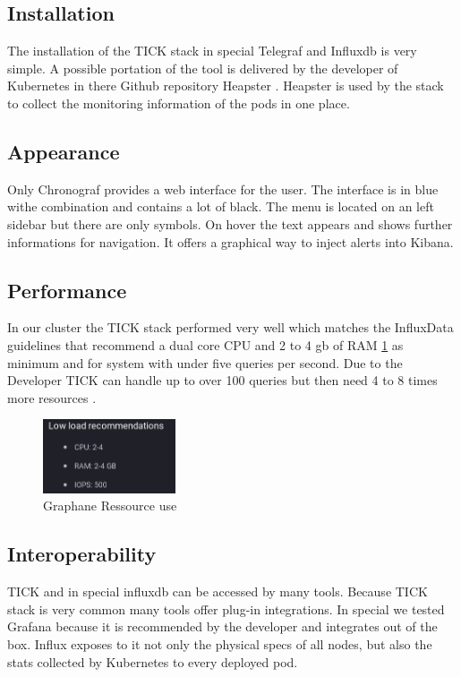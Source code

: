 \subsection{Installation}
The installation of the TICK stack in special Telegraf and Influxdb is very simple. A possible portation of the tool is delivered by the developer of Kubernetes in there Github repository Heapster \cite{heapster}. Heapster is used by the stack to collect the monitoring information of the pods in one place.
\subsection{Appearance}
Only Chronograf provides a web interface for the user. The interface is in blue withe combination and contains a lot of black. The menu is located on an left sidebar but there are only symbols. On hover the text appears and shows further informations for navigation. It offers a graphical way to inject alerts into Kibana.

\subsection{Performance}
In our cluster the TICK stack performed very well which matches the InfluxData guidelines that recommend a dual core CPU and 2 to 4 gb of RAM \cref{fig:TICK_recommendet} as minimum and for system with under five queries per second. Due to the Developer TICK can handle up to over 100 queries but then need 4 to 8 times more resources \cite{influx_require}.
\begin{figure}
\centering
\includegraphics[width=0.35\textwidth]{Bilder/Performance/TICK_recommendet}
\caption{Graphane Ressource use}
\label{fig:TICK_recommendet}
\end{figure}

\subsection{Interoperability}
TICK and in special influxdb can be accessed by many tools. Because TICK stack is very common many tools offer plug-in integrations. In special we tested Grafana because it is recommended by the developer and integrates out of the box. Influx exposes to it not only the physical specs of all nodes, but also the stats collected by Kubernetes to every deployed pod. 
